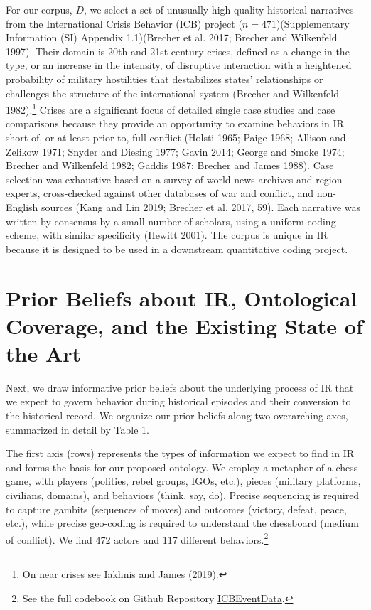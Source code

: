 \documentclass{article}
\begin{document}
For our corpus, \(D\), we select a set of unusually high-quality
historical narratives from the International Crisis Behavior (ICB)
project (\(n=471\))(Supplementary Information (SI) Appendix 1.1)(Brecher
et al. 2017; Brecher and Wilkenfeld 1997). Their domain is 20th and
21st-century crises, defined as a change in the type, or an increase in
the intensity, of disruptive interaction with a heightened probability
of military hostilities that destabilizes states' relationships or
challenges the structure of the international system (Brecher and
Wilkenfeld 1982).\footnote{On near crises see Iakhnis and James (2019).}
Crises are a significant focus of detailed single case studies and case
comparisons because they provide an opportunity to examine behaviors in
IR short of, or at least prior to, full conflict (Holsti 1965; Paige
1968; Allison and Zelikow 1971; Snyder and Diesing 1977; Gavin 2014;
George and Smoke 1974; Brecher and Wilkenfeld 1982; Gaddis 1987; Brecher
and James 1988). Case selection was exhaustive based on a survey of
world news archives and region experts, cross-checked against other
databases of war and conflict, and non-English sources (Kang and Lin
2019; Brecher et al. 2017, 59). Each narrative was written by consensus
by a small number of scholars, using a uniform coding scheme, with
similar specificity (Hewitt 2001). The corpus is unique in IR because it
is designed to be used in a downstream quantitative coding project.

\hypertarget{prior-beliefs-about-ir-ontological-coverage-and-the-existing-state-of-the-art}{%
\section{Prior Beliefs about IR, Ontological Coverage, and the Existing
State of the
Art}\label{prior-beliefs-about-ir-ontological-coverage-and-the-existing-state-of-the-art}}

Next, we draw informative prior beliefs about the underlying process of
IR that we expect to govern behavior during historical episodes and
their conversion to the historical record. We organize our prior beliefs
along two overarching axes, summarized in detail by Table 1.

The first axis (rows) represents the types of information we expect to
find in IR and forms the basis for our proposed ontology. We employ a
metaphor of a chess game, with players (polities, rebel groups, IGOs,
etc.), pieces (military platforms, civilians, domains), and behaviors
(think, say, do). Precise sequencing is required to capture gambits
(sequences of moves) and outcomes (victory, defeat, peace, etc.), while
precise geo-coding is required to understand the chessboard (medium of
conflict). We find 472 actors and 117 different behaviors.\footnote{See
  the full codebook on Github Repository
  \href{https://urldefense.com/v3/__https://github.com/CenterForPeaceAndSecurityStudies/ICBEventData__;!!Mih3wA!WxDJtEczKfxGTh0S2Krunap8ReymFEL5iTWaSfOHeqlSdyfRx77zmjBSWO1OAm13$}{ICBEventData}.}
\end{document}
